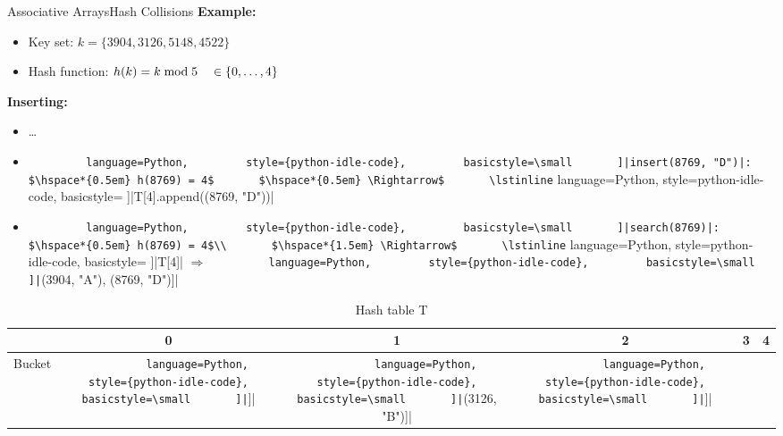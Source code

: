 \begin{frame}{Associative Arrays}{Hash Collisions}
  \textbf{Example:}
  \begin{itemize}
    \item
    Key set: $k = \{3904, 3126, 5148, 4522\}$
    \item
    Hash function:
    $h(k) = k \;\mathrm{mod}\; 5 \hspace*{1.0em} \in \{0, \ldots, 4\}$
  \end{itemize}
  \textbf{Inserting:}
  \begin{itemize}
    \item
      \dots
    \item
      \lstinline[
        language=Python,
        style={python-idle-code},
        basicstyle=\small
      ]|insert(8769, "D")|:
      $\hspace*{0.5em} h(8769) = 4$
      $\hspace*{0.5em} \Rightarrow$
      \lstinline[
        language=Python,
        style={python-idle-code},
        basicstyle=\small
      ]|T[4].append((8769, "D"))|
    \item
      \lstinline[
        language=Python,
        style={python-idle-code},
        basicstyle=\small
      ]|search(8769)|:
      $\hspace*{0.5em} h(8769) = 4$\\
      $\hspace*{1.5em} \Rightarrow$
      \lstinline[
        language=Python,
        style={python-idle-code},
        basicstyle=\small
      ]|T[4]|
      $\Rightarrow$
      \lstinline[
        language=Python,
        style={python-idle-code},
        basicstyle=\small
      ]|[(3904, "A"), (8769, "D")]|
  \end{itemize}
  \vspace*{-1.0em}
  \begin{table}[!b]
    \caption{Hash table T}
    \label{tab:hash_table:example_linked}
    \begin{tabularx}{\textwidth}{l|ccccc}
      {} & 0 & 1 & 2 & 3 & 4\\
      \midrule
      Bucket &
      \lstinline[
        language=Python,
        style={python-idle-code},
        basicstyle=\small
      ]|[]| &
      \lstinline[
        language=Python,
        style={python-idle-code},
        basicstyle=\small
      ]|[(3126, "B")]| &
      \lstinline[
        language=Python,
        style={python-idle-code},
        basicstyle=\small
      ]|[]| &
      \lstinline[
        language=Python,
        style={python-idle-code},

\end{tabularx}
\end{table}
\end{frame}
